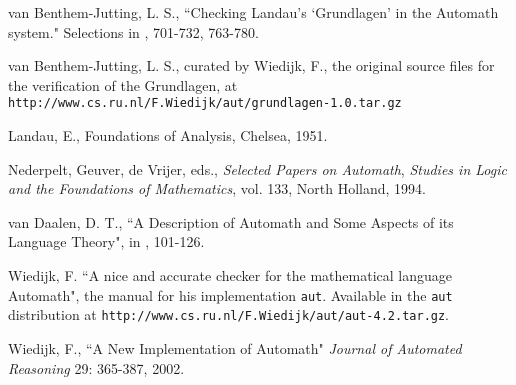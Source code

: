 \documentclass[submission,copyright,creativecommons]{eptcs}
\begin{document}
\begin{thebibliography}{99}
  van Benthem-Jutting, L. S., ``Checking Landau's `Grundlagen' in the Automath system."  Selections in \cite{yellowbook}, 701-732, 763-780.

  van Benthem-Jutting, L. S., curated by Wiedijk, F., the original source files for the verification of the Grundlagen, at {\tt http://www.cs.ru.nl/F.Wiedijk/aut/grundlagen-1.0.tar.gz}

  Landau, E., Foundations of Analysis, Chelsea, 1951.

  Nederpelt, Geuver, de Vrijer, eds., {\em Selected Papers on Automath\/}, {\em Studies in Logic and the Foundations of Mathematics\/}, vol. 133, North Holland, 1994.

  van Daalen, D. T., ``A Description of Automath and Some Aspects of its Language Theory", in \cite{yellowbook}, 101-126.

 Wiedijk, F.  ``A nice and accurate checker for the mathematical language Automath", the manual for his implementation {\tt aut}.  Available in the {\tt aut} distribution at {\tt http://www.cs.ru.nl/F.Wiedijk/aut/aut-4.2.tar.gz}.

  Wiedijk, F., ``A New Implementation of Automath" {\em Journal of Automated Reasoning\/}
29: 365-387, 2002.

\end{thebibliography}
\end{document}
